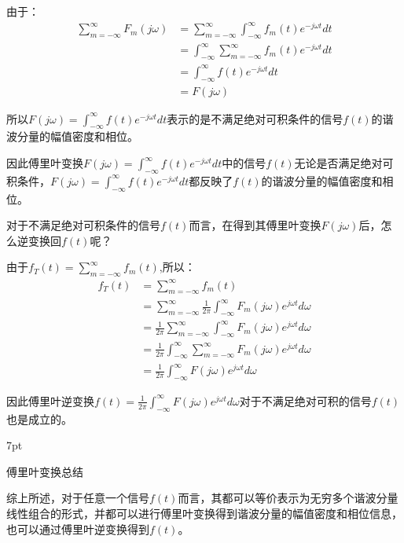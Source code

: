 \documentclass{article}
\numberwithin{equation}{section}
\numberwithin{figure}{section}
\newenvironment{formal}{%
\def\FrameCommand{%
\hspace{1pt}%
{\color{DarkBlue}\vrule width 2pt}%
{\color{formalshade}\vrule width 4pt}%
\colorbox{formalshade}%
}%
\MakeFramed{\advance\hsize-\width\FrameRestore}%
\noindent\hspace{-4.55pt}%
\begin{adjustwidth}{}{7pt}%
\vspace{2pt}\vspace{2pt}%
}
{%
\vspace{2pt}\end{adjustwidth}\endMakeFramed%
}
\begin{document}
由于：
\begin{equation}
    \begin{split}
        \sum_{m=-\infty}^{\infty}F_m(j\omega)&=\sum_{m=-\infty}^{\infty}\int_{-\infty}^{\infty}f_m(t)e^{-j\omega t}dt\\
        &=\int_{-\infty}^{\infty}\sum_{m=-\infty}^{\infty}f_m(t)e^{-j\omega t}dt\\
        &=\int_{-\infty}^{\infty}f(t)e^{-j\omega t}dt\\
        &=F(j\omega)
    \end{split}
\end{equation}

所以$F(j\omega)=\int_{-\infty}^{\infty}f(t)e^{-j\omega t}dt$表示的是不满足绝对可积条件的信号$f(t)$的谐波分量的幅值密度和相位。

因此傅里叶变换$F(j\omega)=\int_{-\infty}^{\infty}f(t)e^{-j\omega t}dt$中的信号$f(t)$无论是否满足绝对可积条件，$F(j\omega)=\int_{-\infty}^{\infty}f(t)e^{-j\omega t}dt$都反映了$f(t)$的谐波分量的幅值密度和相位。

对于不满足绝对可积条件的信号$f(t)$而言，在得到其傅里叶变换$F(j\omega)$后，怎么逆变换回$f(t)$呢？

由于$f_T(t)=\sum_{m=-\infty}^{\infty}f_m(t)$,所以：
\begin{equation}
    \begin{split}
        f_T(t)&=\sum_{m=-\infty}^{\infty}f_m(t)\\
        &=\sum_{m=-\infty}^{\infty}\frac{1}{2\pi}\int_{-\infty}^{\infty}F_m(j\omega)e^{j\omega t}d\omega\\
        &=\frac{1}{2\pi}\sum_{m=-\infty}^{\infty}\int_{-\infty}^{\infty}F_m(j\omega)e^{j\omega t}d\omega\\
        &=\frac{1}{2\pi}\int_{-\infty}^{\infty}\sum_{m=-\infty}^{\infty}F_m(j\omega)e^{j\omega t}d\omega\\
        &=\frac{1}{2\pi}\int_{-\infty}^{\infty}F(j\omega)e^{j\omega t}d\omega
    \end{split}
\end{equation}

因此傅里叶逆变换$f(t)=\frac{1}{2\pi}\int_{-\infty}^{\infty}F(j\omega)e^{j\omega t}d\omega$对于不满足绝对可积的信号$f(t)$也是成立的。

\begin{formal}
    傅里叶变换总结
\end{formal}

综上所述，对于任意一个信号$f(t)$而言，其都可以等价表示为无穷多个谐波分量线性组合的形式，并都可以进行傅里叶变换得到谐波分量的幅值密度和相位信息，也可以通过傅里叶逆变换得到$f(t)$。
\end{document}
